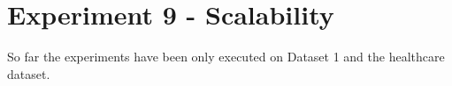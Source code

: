 \newpage
\section{Experiment 9 - Scalability}
\label{sec:exp9}
So far the experiments have been only executed on Dataset 1 and the healthcare dataset.